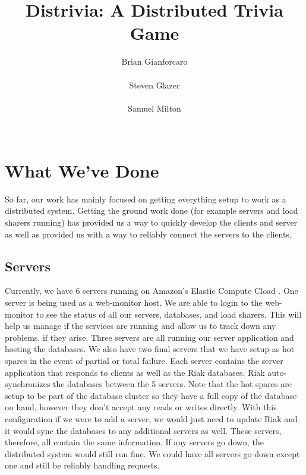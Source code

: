 \documentclass{dependencies/acm_proc_article-sp}
\begin{document}
\title{ Distrivia: A Distributed Trivia Game }
\author{
\alignauthor
Brian Gianforcaro \\
       \\
\alignauthor
Steven Glazer \\
       \\
\alignauthor
Samuel Milton \\
       \\
}
\maketitle


\section {What We've Done}
So far, our work has mainly focused on getting everything setup to work as a
distributed system. Getting the ground work done (for example servers and load
sharers running) has provided us a way to quickly develop the clients
and server as well as provided us with a way to reliably connect the servers to
the clients.
\subsection {Servers}
Currently, we have 6 servers running on Amazon's Elastic Compute Cload \cite{aec}. One server is being used as a web-monitor
host. We are able to login to the web-monitor to see the status of all our
servers, databases, and load sharers. This will help us manage if the services
are running and allow us to track down any problems, if they arise. Three
servers are all running our server application and hosting the databases.
We also have two final servers that we have setup as hot spares in the event
of partial or total failure.
Each server contains the server application that responds to clients as well as
the Riak \cite{riak} databases. Riak auto-synchronizes the databases between the 5 servers.
Note that the hot spares are setup to be part of the database cluster so they
have a full copy of the database on hand, however they don't accept any reads
or writes directly.
With this configuration if we were to add a server, we would just need to update 
Riak and it would sync the databases to any additional servers as well. These servers,
therefore, all contain the same information. If any servers go down, the distributed
system would still run fine. We could have all servers go down except one and still
be reliably handling requests.
\end{document}
